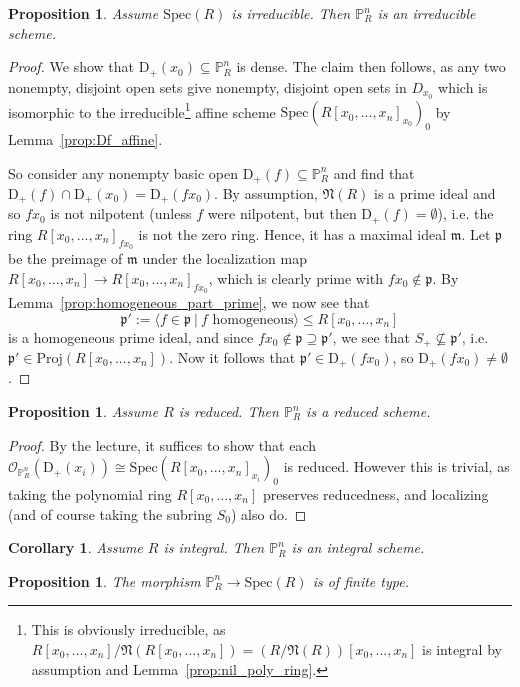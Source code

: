 \documentclass{scrartcl}
\newcommand{\D}[1]{\mathrm{D}_+(#1)}
\renewcommand{\P}{\mathbb{P}}
\newcommand{\p}{\mathfrak{p}}
\newcommand{\m}{\mathfrak{m}}
\renewcommand{\m}{\mathfrak{m}}
\newcommand{\Nil}{\mathfrak{N}}
\newcommand{\Spec}{\mathrm{Spec}}
\newcommand{\Proj}{\mathrm{Proj}}
\renewcommand{\O}{\mathcal{O}}
\newtheorem{prop}[subsection]{Proposition}
\newtheorem{corollary}[subsection]{Corollary}
\theoremstyle{definition}
\begin{document}
\begin{prop}
    Assume $\Spec(R)$ is irreducible.
    Then $\P_R^n$ is an irreducible scheme.
\end{prop}
\begin{proof}
    We show that $\D{x_0} \subseteq \P_R^n$ is dense.
    The claim then follows, as any two nonempty, disjoint open sets give nonempty, disjoint open sets in $D_{x_0}$ which is isomorphic to the 
    irreducible\footnote{This is obviously irreducible, as $R[x_0, ..., x_n]/\Nil(R[x_0, ..., x_n]) = (R/\Nil(R))[x_0, ..., x_n]$ is integral by assumption and Lemma~\ref{prop:nil_poly_ring}.}
    affine scheme $\Spec(R[x_0, ..., x_n]_{x_0})_0$ by Lemma~\ref{prop:Df_affine}.

    So consider any nonempty basic open $\D{f} \subseteq \P_R^n$ and find that $\D{f} \cap \D{x_0} = \D{fx_0}$.
    By assumption, $\Nil(R)$ is a prime ideal and so $fx_0$ is not nilpotent (unless $f$ were nilpotent, but then $\D{f} = \emptyset$), i.e. the ring $R[x_0, ..., x_n]_{fx_0}$ is not the zero ring.
    Hence, it has a maximal ideal $\m$.
    Let $\p$ be the preimage of $\m$ under the localization map $R[x_0, ..., x_n] \to R[x_0, ..., x_n]_{fx_0}$, which is clearly prime with $fx_0 \notin \p$.
    By Lemma~\ref{prop:homogeneous_part_prime}, we now see that
    \begin{equation*}
        \p' := \langle f \in \p \ | \ \text{$f$ homogeneous} \rangle \leq R[x_0, ..., x_n]
    \end{equation*}
    is a homogeneous prime ideal, and since $fx_0 \notin \p \supseteq \p'$, we see that $S_+ \not\subseteq \p'$, i.e. $\p' \in \Proj(R[x_0, ..., x_n])$.
    Now it follows that $\p' \in \D{fx_0}$, so $\D{fx_0} \neq \emptyset$.
\end{proof}
\begin{prop}
    Assume $R$ is reduced.
    Then $\P_R^n$ is a reduced scheme.
\end{prop}
\begin{proof}
    By the lecture, it suffices to show that each $\O_{\P_R^n}(\D{x_i}) \cong \Spec(R[x_0, ..., x_n]_{x_i})_0$ is reduced.
    However this is trivial, as taking the polynomial ring $R[x_0, ..., x_n]$ preserves reducedness, and localizing (and of course taking the subring $S_0$) also do.
\end{proof}
\begin{corollary}
    Assume $R$ is integral.
    Then $\P_R^n$ is an integral scheme.
\end{corollary}
\begin{prop}
    \label{prop:p_quasi_compact}
    The morphism $\P_R^n \to \Spec(R)$ is of finite type.
\end{prop}
\end{document}
